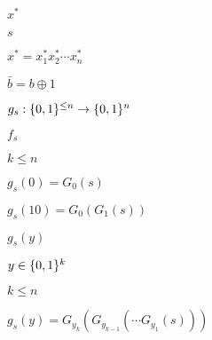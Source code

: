 \documentclass[10pt]{book}
\begin{document}
\begin{mdSnippets}
\begin{mdInlineSnippet}[5d9075efa0ec4b2e8228505844f11742]%
$x^*$\end{mdInlineSnippet}%
\begin{mdInlineSnippet}[03c7c0ace395d80182db07ae2c30f034]%
$s$\end{mdInlineSnippet}%
\begin{mdInlineSnippet}[35397b099e8485293164f9b0c5fe8624]%
$x^* = x^*_1 x^*_2 \cdots x^*_n$\end{mdInlineSnippet}%
\begin{mdInlineSnippet}[a6560a16c57f33e0b66964244a350017]%
$\bar{b} = b \oplus 1$\end{mdInlineSnippet}%
\begin{mdInlineSnippet}[48538948b09a97c08d778292c7aab5e0]%
$g_s: \{0,1\}^{\leq n} \to \{0,1\}^n$\end{mdInlineSnippet}%
\begin{mdInlineSnippet}[983340c663380eacde4a09812e2e3c2c]%
$f_s$\end{mdInlineSnippet}%
\begin{mdInlineSnippet}%
$k \leq n$\end{mdInlineSnippet}%
\begin{mdInlineSnippet}[3770438bd1ec2cccdae10d91c6362c46]%
$g_s(0) = G_0(s)$\end{mdInlineSnippet}%
\begin{mdInlineSnippet}[7c8ded2b7135cb4b68a9db195372a689]%
$g_s(10) = G_0(G_1(s))$\end{mdInlineSnippet}%
\begin{mdInlineSnippet}%
$g_s(y)$\end{mdInlineSnippet}%
\begin{mdInlineSnippet}[25c34d5e2183aad0f511078ce4ef846f]%
$y \in \{0,1\}^k$\end{mdInlineSnippet}%
\begin{mdInlineSnippet}%
$k \leq n$\end{mdInlineSnippet}%
\begin{mdInlineSnippet}[69226679fa1314c8b8d404e8366f86db]%
$g_s(y) = G_{y_k}(G_{y_{k-1}}(\cdots G_{y_1}(s)))$\end{mdInlineSnippet}%

\end{mdSnippets}
\end{document}
